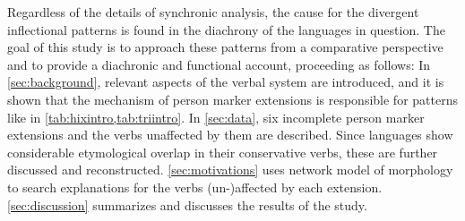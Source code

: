 Regardless of the details of synchronic analysis, the cause for the divergent inflectional patterns is found in the diachrony of the languages in question.
The goal of this study is to approach these patterns from a comparative perspective and to provide a diachronic and functional account, proceeding as follows:
In \cref{sec:background}, relevant aspects of the \PC verbal system are introduced, and it is shown that the mechanism of person marker extensions is responsible for patterns like in \cref{tab:hixintro,tab:triintro}.
In \cref{sec:data}, six incomplete person marker extensions and the verbs unaffected by them are described.
Since languages show considerable etymological overlap in their conservative verbs, these are further discussed and reconstructed.
\cref{sec:motivations} uses  network model of morphology to search explanations for the verbs (un-)affected by each extension.
\cref{sec:discussion} summarizes and discusses the results of the study.

